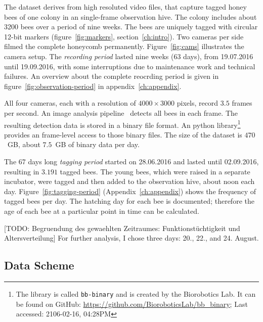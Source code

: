 The dataset derives from high resoluted video files, that capture tagged honey bees of one colony in an single-frame observation hive.
The colony includes about 3200 bees over a period of nine weeks. The bees are uniquely tagged with circular 12-bit markers (figure~\ref{fig:markers}, section~\ref{ch:intro}).
Two cameras per side filmed the complete honeycomb permanently.
Figure~\ref{fig:cams} illustrates the camera setup.
The \emph{recording period} lasted nine weeks (63 days), from 19.07.2016 until 19.09.2016, with some interruptions due to maintenance work and technical failures. An overview about the complete reocrding period is given in figure~\ref{fig:observation-period} in appendix~\ref{ch:appendix}.

All four cameras, each with a resolution of $4000\times3000$ pixels, record $3.5$ frames per second. 
An image analysis pipeline~\cite{wario2015automatic} detects all bees in each frame.
The resulting detection data is stored in a binary file format.
An python library\footnote{The library is called \texttt{bb-binary} and is created by the Biorobotics Lab. It can be found on GitHub: \url{https://github.com/BioroboticsLab/bb_binary}; Last accessed: 2106-02-16, 04:28PM} provides an frame-level access to those binary files.
The size of the dataset is $470$~GB, about $7.5$~GB of binary data per day.

The 67 days long \emph{tagging period} started on 28.06.2016 and lasted until 02.09.2016, resulting in $3.191$ tagged bees. The young bees, which were raised in a separate incubator, were tagged and then added to the observation hive, about noon each day. Figure~\ref{fig:tagging-period} (Appendix~\ref{ch:appendix}) shows the frequency of tagged bees per day. The hatching day for each bee is documented; therefore the age of each bee at a particular point in time can be calculated.

[TODO: Begruendung des gewaehlten Zeitraumes: Funktionstüchtigkeit und Altersverteilung]
For further analysis, I chose three days: 20., 22., and 24. August.

\clearpage
\subsection{Data Scheme}
\label{subsec:datascheme}

